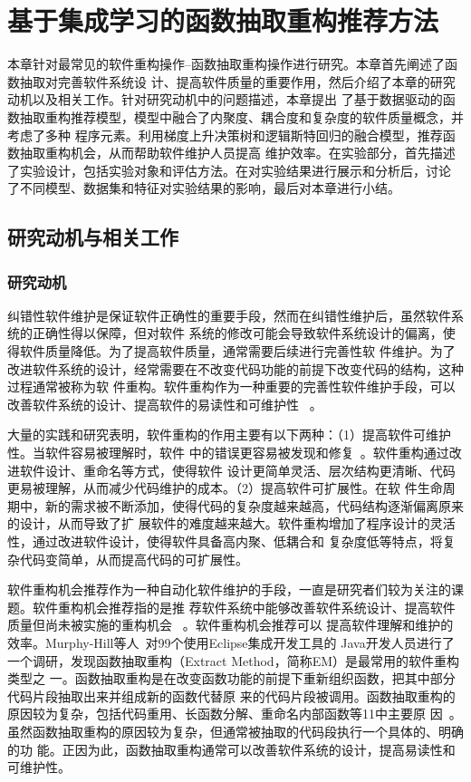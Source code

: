

\chapter{基于集成学习的函数抽取重构推荐方法} 
本章针对最常见的软件重构操作--函数抽取重构操作进行研究。本章首先阐述了函数抽取对完善软件系统设
计、提高软件质量的重要作用，然后介绍了本章的研究动机以及相关工作。针对研究动机中的问题描述，本章提出
了基于数据驱动的函数抽取重构推荐模型，模型中融合了内聚度、耦合度和复杂度的软件质量概念，并考虑了多种
程序元素。利用梯度上升决策树和逻辑斯特回归的融合模型，推荐函数抽取重构机会，从而帮助软件维护人员提高
维护效率。在实验部分，首先描述了实验设计，包括实验对象和评估方法。在对实验结果进行展示和分析后，讨论
了不同模型、数据集和特征对实验结果的影响，最后对本章进行小结。

\section{研究动机与相关工作}
\subsection{研究动机}
纠错性软件维护是保证软件正确性的重要手段，然而在纠错性维护后，虽然软件系统的正确性得以保障，但对软件
系统的修改可能会导致软件系统设计的偏离，使得软件质量降低。为了提高软件质量，通常需要后续进行完善性软
件维护。为了改进软件系统的设计，经常需要在不改变代码功能的前提下改变代码的结构，这种过程通常被称为软
件重构。软件重构作为一种重要的完善性软件维护手段，可以改善软件系统的设计、提高软件的易读性和可维护性
~\cite{fowler,mens:TSE04}。

大量的实践和研究表明，软件重构的作用主要有以下两种：（1）提高软件可维护性。当软件容易被理解时，软件
中的错误更容易被发现和修复~\cite{martin2009clean}。软件重构通过改进软件设计、重命名等方式，使得软件
设计更简单灵活、层次结构更清晰、代码更易被理解，从而减少代码维护的成本。（2）提高软件可扩展性。在软
件生命周期中，新的需求被不断添加，使得代码的复杂度越来越高，代码结构逐渐偏离原来的设计，从而导致了扩
展软件的难度越来越大。软件重构增加了程序设计的灵活性，通过改进软件设计，使得软件具备高内聚、低耦合和
复杂度低等特点，将复杂代码变简单，从而提高代码的可扩展性。

软件重构机会推荐作为一种自动化软件维护的手段，一直是研究者们较为关注的课题。软件重构机会推荐指的是推
荐软件系统中能够改善软件系统设计、提高软件质量但尚未被实施的重构机会
~\cite{fokaefs:icse11,higo:JSME,Liu:IEEE-TSE:12,Tourwe:CSMR03,Tsantalis:2011}。软件重构机会推荐可以
提高软件理解和维护的效率。Murphy-Hill等人~\cite{Murphy-Hill:ICSE09}对99个使用Eclipse集成开发工具的
Java开发人员进行了一个调研，发现函数抽取重构（Extract Method，简称EM）是最常用的软件重构类型之
一。函数抽取重构是在改变函数功能的前提下重新组织函数，把其中部分代码片段抽取出来并组成新的函数代替原
来的代码片段被调用。函数抽取重构的原因较为复杂，包括代码重用、长函数分解、重命名内部函数等11中主要原
因~\cite{silva2016we}。虽然函数抽取重构的原因较为复杂，但通常被抽取的代码段执行一个具体的、明确的功
能。正因为此，函数抽取重构通常可以改善软件系统的设计，提高易读性和可维护性。

